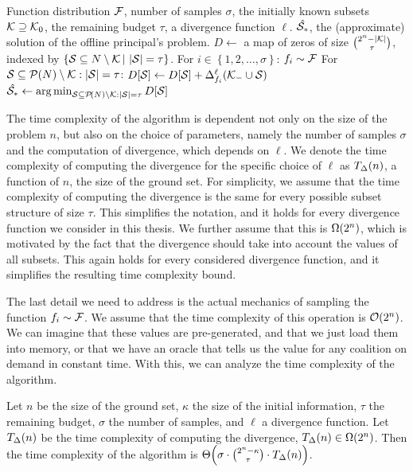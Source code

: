 \begin{algor}{\label{alg:fo}\algFO{}}{Function distribution $ \fdist $, number of samples $ \sigma $, the initially known subsets $ \k \supseteq \k_0 $, the remaining budget $ \tau $, a divergence function $ \ell $.}
  {$ \hat{\s_*} $, the (approximate) solution of the offline principal's problem.}
  \State $ D \gets $ a map of zeros of size $ \binom{2^n-\absolute{\k}}{\tau} $, indexed by $ \left\{ \s \subseteq N \setminus \k \suchthat \absolute{\s} = \tau \right\} $.
  \Indent For $ i \in \left\{ 1, 2, \ldots, \sigma \right\} $:
    \State $ f_i \sim \fdist $
    \Indent For $ \s \subseteq \pot{N} \setminus \k: \absolute{\s} = \tau $:
    \State $ D[\s] \gets D[\s] + \divg[f_i] \ell {\k_- \cup \s} $
    \EndIndent
  \EndIndent
  \State $ \hat{\s_*} \gets \argmin_{\s \subseteq \pot{N} \setminus \k: \absolute{\s} = \tau} D[\s] $
\end{algor}

The time complexity of the \algFO{} algorithm is dependent not only on the size of the problem $ n $, but also on the choice of parameters, namely the number of samples $ \sigma $ and the computation of divergence, which depends on $ \ell $.
We denote the time complexity of computing the divergence for the specific choice of $ \ell $ as $ \fce\divt{n} $, a function of $ n $, the size of the ground set.
For simplicity, we assume that the time complexity of computing the divergence is the same for every possible subset structure of size $ \tau $.
This simplifies the notation, and it holds for every divergence function we consider in this thesis.
We further assume that this is $ \fce{\Omega}{2^n} $, which is motivated by the fact that the divergence should take into account the values of all subsets.
This again holds for every considered divergence function, and it simplifies the resulting time complexity bound.

The last detail we need to address is the actual mechanics of sampling the function $ f_i \sim \fdist $.
We assume that the time complexity of this operation is $ \fce{\O}{2^n} $.
We can imagine that these values are pre-generated, and that we just load them into memory, or that we have an oracle that tells us the value for any coalition on demand in constant time.
With this, we can analyze the time complexity of the \algFO{} algorithm.

\begin{prop}
  \label{thm:algfo-time-complexity}
  Let $ n $ be the size of the ground set, $ \kappa $ the size of the initial information, $ \tau $ the remaining budget, $ \sigma $ the number of samples, and $ \ell $ a divergence function.
  Let $ \fce\divt{n} $ be the time complexity of computing the divergence, $ \fce{\divt}{n} \in \fce{\Omega}{2^n} $.
  Then the time complexity of the \algFO{} algorithm is $ \fce\Theta{\sigma \cdot \binom{2^n-\kappa}{\tau} \cdot \fce\divt{n}} $.
\end{prop}

